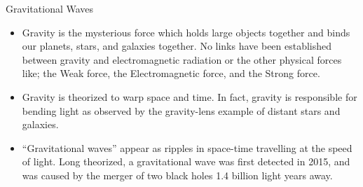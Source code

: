 {\white

{\Large Gravitational Waves}

\begin{itemize}

\item Gravity is the mysterious force which holds large objects together and binds our planets, stars, and galaxies together. No links have been established between gravity and electromagnetic radiation or the other physical forces like; the Weak force, the Electromagnetic force, and the Strong force.

\item Gravity is theorized to warp space and time. In fact, gravity is responsible for bending light as observed by the gravity-lens example of distant stars and galaxies.

\item ``Gravitational waves'' appear as ripples in space-time travelling at the speed of light. Long theorized, a gravitational wave was first detected in 2015, and was caused by the merger of two black holes 1.4 billion light years away.

\end{itemize}
}


